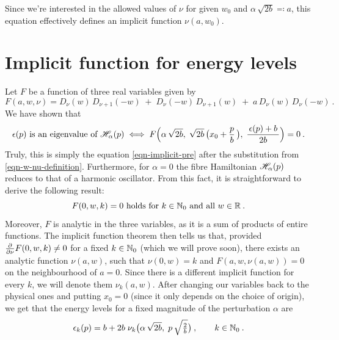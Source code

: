 Since we're interested in the allowed values of $\nu$ for given $w_0$ and $\alpha \, \sqrt{2b} \eqqcolon a$, this equation effectively defines an implicit function $\nu(a, w_0)$.

\section{Implicit function for energy levels}
Let $F$ be a function of three real variables given by
\begin{equation*}
    F(a, w, \nu) =
    D_\nu(w) \, D_{\nu+1}(-w)
    \;+\; D_\nu(-w) \, D_{\nu+1}(w)
    \;+\; a \, D_\nu(w) \, D_\nu(-w)
    \: .
\end{equation*}
We have shown that
\begin{align*}
    \epsilon(p) \text{ is an eigenvalue of } \mathscr{H}_\alpha(p)
    \; \Longleftrightarrow \;
    F\Big(
        \alpha \, \sqrt{2b}, \;
        \sqrt{2b} \, \big( x_0 + \frac{p}{b} \, \big), \;
        \frac{\, \epsilon(p) + b \,}{2b}
    \Big) = 0 \: .
\end{align*}
Truly, this is simply the equation \eqref{eqn-implicit-pre} after the substitution from \eqref{eqn-w-nu-definition}. Furthermore, for $\alpha = 0$ the fibre Hamiltonian $\mathscr{H}_\alpha(p)$ reduces to that of a harmonic oscillator. From this fact, it is straightforward to derive the following result:
\begin{equation*}
    F(0, w, k) = 0
    \text{ holds for }
    k \in \mathbb{N}_0
    \text{ and all }
    w \in \mathbb{R}
    \: .
\end{equation*}
Moreover, $F$ is analytic in the three variables, as it is a sum of products of entire functions. The implicit function theorem then tells us that, provided $\frac{\partial }{\partial \nu} F(0, w, k) \neq 0$ for a fixed $k \in \mathbb{N}_0$ (which we will prove soon), there exists an analytic function $\nu(a, w)$, such that $\nu(0,w) = k$ and $F(a, w, \nu(a,w)) = 0$ on the neighbourhood of $a=0$. Since there is a different implicit function for every $k$, we will denote them $\nu_k(a,w)$. After changing our variables back to the physical ones and putting $x_0=0$ (since it only depends on the choice of origin), we get that the energy levels for a fixed magnitude of the perturbation $\alpha$ are
\begin{equation*}
    \epsilon_k(p) = b + 2b\;\nu_k\big( \alpha \, \sqrt{2b}, \; p \, \sqrt{\tfrac{2}{b}}  \big) \: ,
    \qquad k \in \mathbb{N}_0 \: .
\end{equation*}

